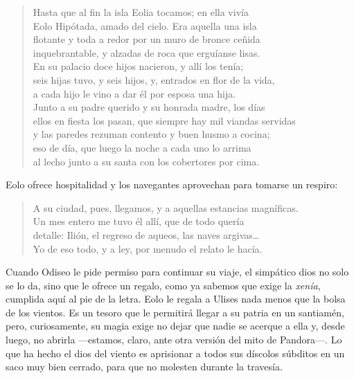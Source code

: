 \documentclass[11pt,a4paper]{article}
\begin{document}
\begin{verse}
Hasta que al fin la isla Eolia tocamos; en ella vivía\\
Eolo Hipótada, amado del cielo. Era aquella una isla\\
flotante y toda a redor por un muro de bronce ceñida\\
inquebrantable, y alzadas de roca que erguíanse lisas.\\
En su palacio doce hijos nacieron, y allí los tenía;\\
seis hijas tuvo, y seis hijos, y, entrados en flor de la vida,\\
a cada hijo le vino a dar él por esposa una hija.\\
Junto a su padre querido y su honrada madre, los días\\
ellos en fiesta los pasan, que siempre hay mil viandas servidas\\
y las paredes rezuman contento y buen husmo a cocina;\\
eso de día, que luego la noche a cada uno lo arrima\\
al lecho junto a su santa con los cobertores por cima.
\end{verse}

Eolo ofrece hospitalidad y los navegantes aprovechan para tomarse un respiro:

\begin{verse}
A su ciudad, pues, llegamos, y a aquellas estancias magníficas.\\
Un mes entero me tuvo él allí, que de todo quería\\
detalle: Ilión, el regreso de aqueos, las naves argivas…\\
Yo de eso todo, y a ley, por menudo el relato le hacía.
\end{verse}

Cuando Odiseo le pide permiso para continuar su viaje, el simpático dios no solo se lo da, sino que le ofrece un regalo, como ya sabemos que exige la \emph{xenía}, cumplida aquí al pie de la letra. Eolo le regala a Ulises nada menos que la bolsa de los vientos. Es un tesoro que le permitirá llegar a su patria en un santiamén, pero, curiosamente, su magia exige no dejar que nadie se acerque a ella y, desde luego, no abrirla ---estamos, claro, ante otra versión del mito de Pandora---. Lo que ha hecho el dios del viento es aprisionar a todos sus díscolos súbditos en un saco muy bien cerrado, para que no molesten durante la travesía.
\end{document}
